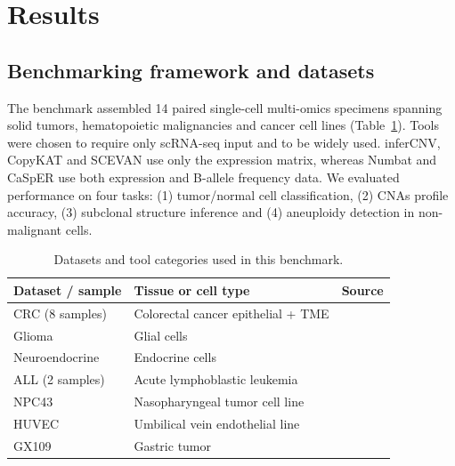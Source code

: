 \documentclass[11pt]{article}
\begin{document}
\section{Results}

\subsection{Benchmarking framework and datasets}
The benchmark assembled 14 paired single-cell multi-omics specimens spanning solid tumors, hematopoietic malignancies and cancer cell lines (Table~\ref{tab:datasets}). Tools were chosen to require only scRNA-seq input and to be widely used. inferCNV, CopyKAT and SCEVAN use only the expression matrix, whereas Numbat and CaSpER use both expression and B-allele frequency data. We evaluated performance on four tasks: (1) tumor/normal cell classification, (2) CNAs profile accuracy, (3) subclonal structure inference and (4) aneuploidy detection in non-malignant cells.

\begin{table}[ht]
\centering
\caption{Datasets and tool categories used in this benchmark.}
\label{tab:datasets}
\begin{tabular}{lll}
\toprule
Dataset / sample & Tissue or cell type & Source \\
\midrule
CRC (8 samples) & Colorectal cancer epithelial + TME & \citet{zhou2023crc} \\
Glioma          & Glial cells                        & \citet{yu2023npc} \\
Neuroendocrine  & Endocrine cells                    & \citet{cui2021neuroendocrine} \\
ALL (2 samples) & Acute lymphoblastic leukemia       & \citet{zachariadis2020all} \\
NPC43           & Nasopharyngeal tumor cell line     & \citet{yu2023npc} \\
HUVEC           & Umbilical vein endothelial line    & \citet{yu2023npc} \\
GX109           & Gastric tumor                      & \citet{huang2023gastric} \\
\bottomrule
\end{tabular}
\end{table}
\end{document}
